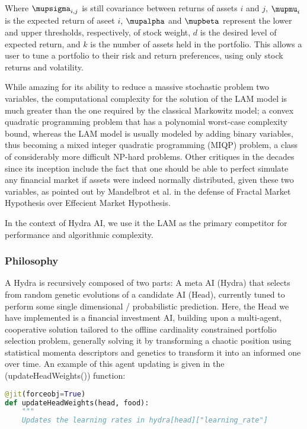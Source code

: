 \documentclass[11pt, a4paper]{awesome-cv}
\begin{document}
\begin{cvletter}
Where \(\mupsigma_{i,j}\) is still covariance between returns of assets \(i\) and \(j\),
\(\mupmu_{i}\) is the expected return of aseet \(i\), \(\mupalpha\) and \(\mupbeta\) represent
the lower and upper thresholds, respectively, of stock weight, \(d\) is the
desired level of expected return, and \(k\) is the number of assets held in the
portfolio. This allows a user to tune a portfolio to their risk and return preferences,
using only stock returns and volatility.

While amazing for its ability to reduce
a massive stochastic problem two variables, the computational complexity for the
solution of the LAM model is much greater than the one required by the classical
Markowitz model; a convex quadratic programming problem that has a polynomial
worst-case complexity bound, whereas the LAM model is usually modeled by adding
binary variables, thus becoming a mixed integer quadratic programming (MIQP)
problem, a class of considerably more difficult NP-hard problems. Other
critiques in the decades since its inception include the fact that one should
be able to perfect simulate any financial market if assets were indeed normally
distributed, given these two variables, as pointed out by Mandelbrot et al. in
the defense of Fractal Market Hypothesis over Effecient Market Hypothesis.

In the context of Hydra AI, we use it the LAM as the primary competitor for
performance and algorithmic complexity.

\subsubsection{Philosophy}

A Hydra is recursively composed of two parts: A meta AI (Hydra) that selects
from random genetic evolutions of a candidate AI (Head), currently tuned to
perform some single dimensional / probabilistic prediction. Here, the Head we
have implemented is a financial investment AI, building upon a multi-agent,
cooperative solution tailored to the offline cardinality constrained portfolio
selection problem, generally solving it by transforming a chaotic position using
statistical momenta descriptors and genetics to transform it into an informed
one over time. An example of this agent updating is given in the \mathrm(updateHeadWeights()) function:

\begin{lstlisting}[language=Python]
@jit(forceobj=True)
def updateHeadWeights(head, food):
    """
    Updates the learning rates in hydra[head]["learning_rate"]


\end{lstlisting}
\end{cvletter}
\end{document}
